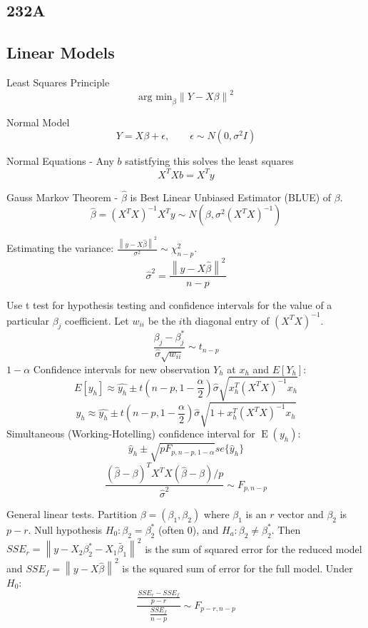 \documentclass[10pt, twocolumn]{article}
\newcommand{\norm}[1]{\left\lVert#1\right\rVert}
\newcommand{\Expect}{\operatorname{E}}
\begin{document}
\newpage

\subsection*{232A}
\subsection*{Linear Models}

Least Squares Principle
\[
    \text{arg min}_\beta \norm{Y - X\beta}^2
\]

Normal Model 
\[
    Y = X\beta + \epsilon, \qquad \epsilon \sim N(0, \sigma^2 I)
\]

Normal Equations - Any $b$ satistfying this solves the least squares
\[
    X^T X b = X^T y
\]

Gauss Markov Theorem - $\hat{\beta}$ is Best Linear Unbiased
Estimator (BLUE) of $\beta$.
\[
    \hat{\beta} = (X^T X)^{-1} X^T y \sim N(\beta, \sigma^2 (X^T X)^{-1})
\]

Estimating the variance: $\frac{\norm{y - X \hat{\beta}}^2}{\sigma^2} \sim
\chi^2_{n-p}$.
\[
    \hat{\sigma}^2 = \frac{\norm{y - X \hat{\beta}}^2}{n - p}
\]

Use t test for hypothesis testing and confidence intervals for the value of
a particular $\beta_j$ coefficient. 
Let $w_{ii}$ be the $i$th diagonal entry of $(X^T X)^{-1}$.
\[
    \frac{\beta_j - \beta_j^*}{\hat{\sigma} \sqrt{w_{ii}}} \sim t_{n-p}
\]
$1 - \alpha$ Confidence intervals for new observation $Y_h$ at $x_h$ and $E[Y_h]$:
\[
    E[y_h] \approx \hat{y_h} \pm t(n-p, 1 - \frac{\alpha}{2}) \hat{\sigma}
        \sqrt{x_h^T (X^T X)^{-1} x_h}
\]
\[
    y_h \approx \hat{y_h} \pm t(n-p, 1 - \frac{\alpha}{2}) \hat{\sigma}
        \sqrt{1 + x_h^T (X^T X)^{-1} x_h}
\]
Simultaneous (Working-Hotelling) confidence interval for $\Expect (y_h)$:
\[
    \hat{y}_h \pm \sqrt{p F_{p, n - p, 1 - \alpha}} se\{ \hat{y}_h \}
\]
\[
    \frac{(\hat{\beta} - \beta)^T X^T X (\hat{\beta} - \beta) /
    p}{\hat{\sigma}^2}
    \sim F_{p, n - p}
\]

General linear tests. Partition $\beta = (\beta_1, \beta_2)$ where $\beta_1$
is an $r$ vector and $\beta_2$ is $p - r$. Null hypothesis $H_0: \beta_2 =
\beta_2^*$ (often 0), and $H_a: \beta_2 \neq \beta_2^*$. Then
$SSE_r = \norm{y - X_2 \beta_2^* - X_1 \tilde{\beta_1}}^2$ is the sum of
squared error for the reduced model and 
$SSE_f = \norm{y - X \hat{\beta}}^2$ is the squared sum of error for the
full model.
Under $H_0$:
\[
    \frac{\frac{SSE_r - SSE_f}{p - r}}
         {\frac{SSE_f}{n - p}}
         \sim F_{p-r, n-p}
\]
\end{document}
